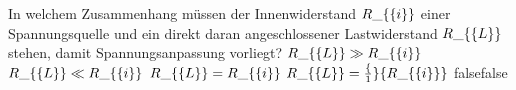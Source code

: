     {In welchem Zusammenhang müssen der Innenwiderstand $R\_\{\textrm\{i\}\}$ einer Spannungsquelle und ein direkt daran angeschlossener Lastwiderstand $R\_\{\textrm\{L\}\}$ stehen, damit Spannungsanpassung vorliegt?}
    {$R\_\{\textrm\{L\}\} \gg R\_\{\textrm\{i\}\}$}
    {$R\_\{\textrm\{L\}\} \ll R\_\{\textrm\{i\}\}$}
    {$R\_\{\textrm\{L\}\} = R\_\{\textrm\{i\}\}$}
    {$R\_\{\textrm\{L\}\} = \frac\{1\}\{R\_\{\textrm\{i\}\}\}$}
    {false}{false}